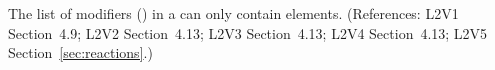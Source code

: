 The list of modifiers () in a \Reaction can only
contain  elements.  (References: L2V1
Section~4.9; L2V2 Section~4.13; L2V3 Section~4.13; L2V4 Section~4.13; L2V5 Section~\ref{sec:reactions}.)
